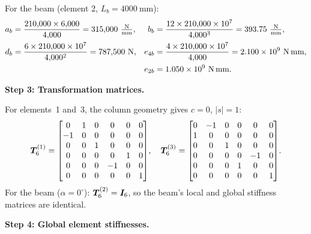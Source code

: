 \begin{example}
For the beam (element 2, $L_b = 4000\ \text{mm}$):
\begin{align*}
  a_b &= \frac{210{,}000 \times 6{,}000}{4{,}000} = 315{,}000\ \tfrac{\text{N}}{\text{mm}},
  &b_b &= \frac{12 \times 210{,}000 \times 10^7}{4{,}000^3} = 393.75\ \tfrac{\text{N}}{\text{mm}},\\
  d_b &= \frac{6 \times 210{,}000 \times 10^7}{4{,}000^2} = 787{,}500\ \text{N},
  &e_{4b} &= \frac{4 \times 210{,}000 \times 10^7}{4{,}000} = 2.100\times10^9\ \text{N\,mm},\\
  &&e_{2b} &= 1.050\times10^9\ \text{N\,mm}.
\end{align*}

\medskip
\noindent\textbf{Step 3: Transformation matrices.}

For elements~1 and~3, the column geometry gives $c=0$, $|s|=1$:
\[
    \bm{T}_6^{(1)} =
    \begin{bmatrix}
         0 &  1 & 0 & 0 &  0 & 0 \\
        -1 &  0 & 0 & 0 &  0 & 0 \\
         0 &  0 & 1 & 0 &  0 & 0 \\
         0 &  0 & 0 & 0 &  1 & 0 \\
         0 &  0 & 0 &-1 &  0 & 0 \\
         0 &  0 & 0 & 0 &  0 & 1
    \end{bmatrix}\!,\quad
    \bm{T}_6^{(3)} =
    \begin{bmatrix}
         0 & -1 & 0 &  0 &  0 & 0 \\
         1 &  0 & 0 &  0 &  0 & 0 \\
         0 &  0 & 1 &  0 &  0 & 0 \\
         0 &  0 & 0 &  0 & -1 & 0 \\
         0 &  0 & 0 &  1 &  0 & 0 \\
         0 &  0 & 0 &  0 &  0 & 1
    \end{bmatrix}\!.
\]
For the beam ($\alpha=0^\circ$): $\bm{T}_6^{(2)} = \bm{I}_6$, so the beam's
local and global stiffness matrices are identical.

\medskip
\noindent\textbf{Step 4: Global element stiffnesses.}


\end{example}
